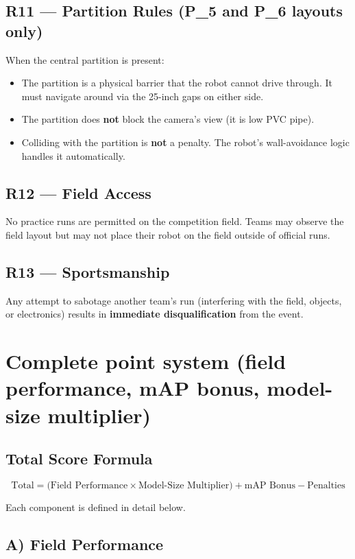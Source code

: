 \documentclass[a4]{article}
\begin{document}
\subsection*{R11 --- Partition Rules (P\_5 and P\_6 layouts only)}
When the central partition is present:
\begin{itemize}
    \item The partition is a physical barrier that the robot cannot drive through. It must navigate around via the 25-inch gaps on either side.
    \item The partition does \textbf{not} block the camera's view (it is low PVC pipe).
    \item Colliding with the partition is \textbf{not} a penalty. The robot's wall-avoidance logic handles it automatically.
\end{itemize}

\subsection*{R12 --- Field Access}
No practice runs are permitted on the competition field. Teams may observe the field layout but may not place their robot on the field outside of official runs.

\subsection*{R13 --- Sportsmanship}
Any attempt to sabotage another team's run (interfering with the field, objects, or electronics) results in \textbf{immediate disqualification} from the event.

\section*{Complete point system (field performance, mAP bonus, model-size multiplier)}
\subsection*{Total Score Formula}

\begin{equation*}
\boxed{\text{Total} = \bigl(\text{Field Performance} \times \text{Model-Size Multiplier}\bigr) + \text{mAP Bonus} - \text{Penalties}}
\end{equation*}

Each component is defined in detail below.

\subsection*{A) Field Performance}
\end{document}
